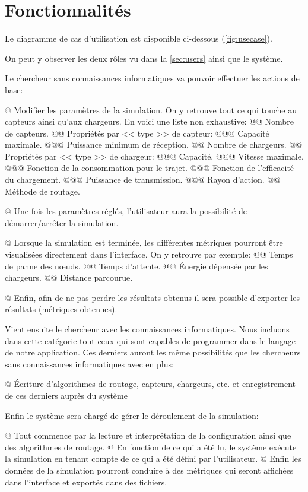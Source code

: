 \documentclass[final]{polytech/polytech}
\begin{document}
	
	\section{Fonctionnalités}
		Le diagramme de cas d'utilisation est disponible ci-dessous (\autoref{fig:usecase}).
		
		On peut y observer les deux rôles vu dans la \autoref{sec:users} ainsi que le système.
		
		Le chercheur sans connaissances informatiques va pouvoir effectuer les actions de base:
		\begin{easylist}[itemize]
			@ Modifier les paramètres de la simulation.
			On y retrouve tout ce qui touche au capteurs ainsi qu'aux chargeurs.
			En voici une liste non exhaustive:
			@@ Nombre de capteurs.
			@@ Propriétés par << type >> de capteur:
			@@@ Capacité maximale.
			@@@ Puissance minimum de réception.
			@@ Nombre de chargeurs.
			@@ Propriétés par << type >> de chargeur:
			@@@ Capacité.
			@@@ Vitesse maximale.
			@@@ Fonction de la consommation pour le trajet.
			@@@ Fonction de l'efficacité du chargement.
			@@@ Puissance de transmission.
			@@@ Rayon d'action.
			@@ Méthode de routage.
			
			@ Une fois les paramètres réglés, l'utilisateur aura la possibilité de démarrer/arrêter la simulation.
			
			@ Lorsque la simulation est terminée, les différentes métriques pourront être visualisées directement dans l'interface.
			On y retrouve par exemple:
			@@ Temps de panne des n\oe uds.
			@@ Temps d'attente.
			@@ Énergie dépensée par les chargeurs.
			@@ Distance parcourue.
			
			@ Enfin, afin de ne pas perdre les résultats obtenus il sera possible d'exporter les résultats (métriques obtenues).
		\end{easylist}
		
		Vient ensuite le chercheur avec les connaissances informatiques.
		Nous incluons dans cette catégorie tout ceux qui sont capables de programmer dans le langage de notre application.
		Ces derniers auront les même possibilités que les chercheurs sans connaissances informatiques avec en plus:
		\begin{easylist}[itemize]
			@ Écriture d'algorithmes de routage, capteurs, chargeurs, etc. et enregistrement de ces derniers auprès du système
		\end{easylist}
		
		Enfin le système sera chargé de gérer le déroulement de la simulation:
		\begin{easylist}[itemize]
			@ Tout commence par la lecture et interprétation de la configuration ainsi que des algorithmes de routage.
			@ En fonction de ce qui a été lu, le système exécute la simulation en tenant compte de ce qui a été défini par l'utilisateur.
			@ Enfin les données de la simulation pourront conduire à des métriques qui seront affichées dans l'interface et exportés dans des fichiers.
		\end{easylist}
\end{document}
